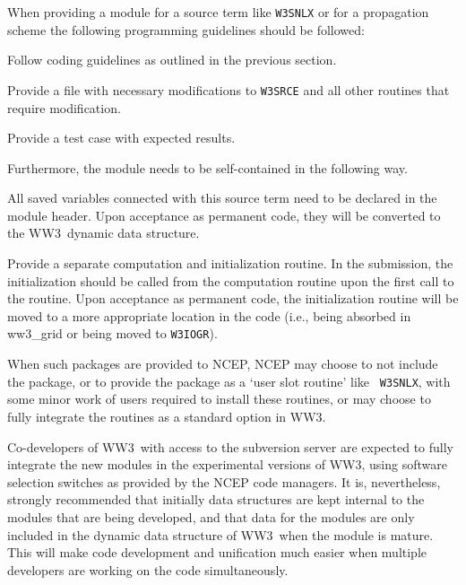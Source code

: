 \documentclass[12pt]{article}
\newcommand{\ws}{WW3}
\newcommand{\file}{\sf}
\newcommand{\code}{\tt}
\newcounter{mylistno}
\begin{document}
When providing a module for a source term like {\code W3SNLX} or for a
propagation scheme the following programming guidelines should be followed:

\begin{list}{)}{ \rightmargin 8mm
                                \leftmargin 10mm }
\item Follow coding guidelines as outlined in the previous section.
\item Provide a file with necessary modifications to {\code W3SRCE} and all
      other routines that require modification.
\item Provide a test case with expected results.
\end{list}

\noindent
Furthermore, the module needs to be self-contained in the following way.

\begin{list}{)}{ \rightmargin 8mm
                                \leftmargin 10mm }
\item All saved variables connected with this source term need to be declared
      in the module header. Upon acceptance as permanent code, they will be
      converted to the \ws\ dynamic data structure.
\item Provide a separate computation and initialization routine.  In the
      submission, the initialization should be called from the computation
      routine upon the first call to the routine. Upon acceptance as permanent
      code, the initialization routine will be moved to a more appropriate
      location in the code (i.e., being absorbed in {\file ww3\_grid} or being
      moved to {\code W3IOGR}).
\end{list}

\noindent
When such packages are provided to NCEP, NCEP may choose to not include the
package, or to provide the package as a `user slot routine' like {\code
W3SNLX}, with some minor work of users required to install these routines, or
may choose to fully integrate the routines as a standard option in \ws.

\vspace{\baselineskip} \noindent Co-developers of \ws\ with access to the
subversion server are expected to fully integrate the new modules in the
experimental versions of \ws, using software selection switches as provided by
the NCEP code managers. It is, nevertheless, strongly recommended that
initially data structures are kept internal to the modules that are being
developed, and that data for the modules are only included in the dynamic data
structure of \ws\ when the module is mature. This will make code development
and unification much easier when multiple developers are working on the code
simultaneously.
\end{document}
